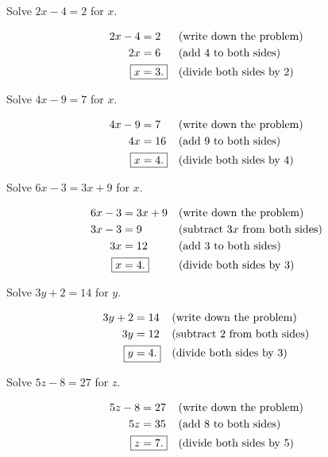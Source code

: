 \begin{questions}

\question Solve $2x-4 = 2$ for $x$. 
\ifprintanswers
\begin{solution}
\begin{align*}
2x - 4 &= 2 & & \text{(write down the problem)} \\
2x &= 6 & & \text{(add 4 to both sides)} \\
\Aboxed{x &= 3.} & & \text{(divide both sides by 2)}
\end{align*}
\end{solution}
\else
\qsppp
\fi

\question Solve $4x - 9 = 7$ for $x$.
\ifprintanswers
\begin{solution}
\begin{align*}
4x - 9 &= 7 & & \text{(write down the problem)} \\
4x &= 16 & & \text{(add 9 to both sides)} \\
\Aboxed{x &= 4.} & & \text{(divide both sides by 4)}
\end{align*}
\end{solution}
\else
\qsppp
\fi

\question Solve $6x - 3 = 3x + 9$ for $x$.
\ifprintanswers
\begin{solution}
\begin{align*}
6x - 3 &= 3x + 9 & & \text{(write down the problem)} \\
3x - 3 &= 9 & & \text{(subtract $3x$ from both sides)} \\
3x &= 12 & & \text{(add 3 to both sides)} \\
\Aboxed{x &= 4.} & & \text{(divide both sides by 3)}
\end{align*}
\end{solution}
\else
\qsppp
\fi
\question Solve \( 3y + 2 = 14 \) for \( y \).
\ifprintanswers
\begin{solution}
\begin{align*}
3y + 2 &= 14 & & \text{(write down the problem)} \\
3y &= 12 & & \text{(subtract 2 from both sides)} \\
\Aboxed{y &= 4.} & & \text{(divide both sides by 3)}
\end{align*}
\end{solution}
\else
\qsppp
\fi

\question Solve \( 5z - 8 = 27 \) for \( z \).
\ifprintanswers
\begin{solution}
\begin{align*}
5z - 8 &= 27 & & \text{(write down the problem)} \\
5z &= 35 & & \text{(add 8 to both sides)} \\
\Aboxed{z &= 7.} & & \text{(divide both sides by 5)}
\end{align*}
\end{solution}
\else
\qsppp
\fi

\end{questions}
\newpage
